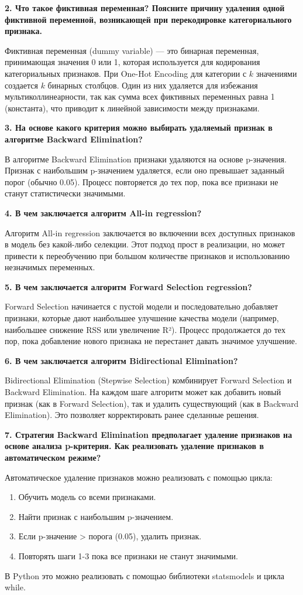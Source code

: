 \textbf{2. Что такое фиктивная переменная? Поясните причину удаления одной фиктивной переменной, возникающей при перекодировке категориального признака.}

Фиктивная переменная (dummy variable) — это бинарная переменная, принимающая значения 0 или 1, которая используется для кодирования категориальных признаков. При One-Hot Encoding для категории с $k$ значениями создается $k$ бинарных столбцов. Один из них удаляется для избежания мультиколлинеарности, так как сумма всех фиктивных переменных равна 1 (константа), что приводит к линейной зависимости между признаками.

\textbf{3. На основе какого критерия можно выбирать удаляемый признак в алгоритме Backward Elimination?}

В алгоритме Backward Elimination признаки удаляются на основе p-значения. Признак с наибольшим p-значением удаляется, если оно превышает заданный порог (обычно 0.05). Процесс повторяется до тех пор, пока все признаки не станут статистически значимыми.

\textbf{4. В чем заключается алгоритм All-in regression?}

Алгоритм All-in regression заключается во включении всех доступных признаков в модель без какой-либо селекции. Этот подход прост в реализации, но может привести к переобучению при большом количестве признаков и использованию незначимых переменных.

\textbf{5. В чем заключается алгоритм Forward Selection regression?}

Forward Selection начинается с пустой модели и последовательно добавляет признаки, которые дают наибольшее улучшение качества модели (например, наибольшее снижение RSS или увеличение R²). Процесс продолжается до тех пор, пока добавление нового признака не перестанет давать значимое улучшение.

\textbf{6. В чем заключается алгоритм Bidirectional Elimination?}

Bidirectional Elimination (Stepwise Selection) комбинирует Forward Selection и Backward Elimination. На каждом шаге алгоритм может как добавить новый признак (как в Forward Selection), так и удалить существующий (как в Backward Elimination). Это позволяет корректировать ранее сделанные решения.

\textbf{7. Стратегия Backward Elimination предполагает удаление признаков на основе анализа p-критерия. Как реализовать удаление признаков в автоматическом режиме?}

Автоматическое удаление признаков можно реализовать с помощью цикла:
\begin{enumerate}
    \item Обучить модель со всеми признаками.
    \item Найти признак с наибольшим p-значением.
    \item Если p-значение > порога (0.05), удалить признак.
    \item Повторять шаги 1-3 пока все признаки не станут значимыми.
\end{enumerate}
В Python это можно реализовать с помощью библиотеки statsmodels и цикла while.

